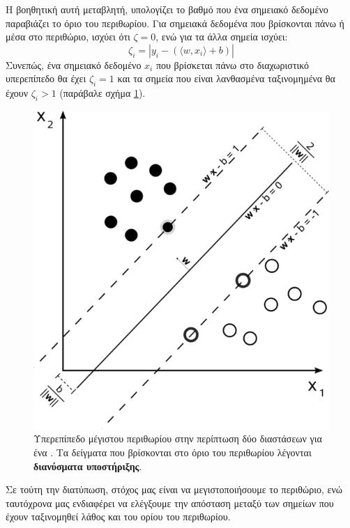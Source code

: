 Η βοηθητική αυτή μεταβλητή, υπολογίζει το βαθμό που ένα σημειακό δεδομένο παραβιάζει το όριο του περιθωρίου.
Για σημειακά δεδομένα που βρίσκονται πάνω ή μέσα στο περιθώριο, ισχύει ότι $\zeta = 0$, ενώ για τα άλλα σημεία ισχύει:
\begin{equation}
\zeta_{i} = | y_{i} - (\langle w, x_{i} \rangle + b )|    
\end{equation}
Συνεπώς, ένα σημειακό δεδομένο $x_{i}$ που βρίσκεται πάνω στο διαχωριστικό υπερεπίπεδο θα έχει $\zeta_{i} = 1$ και τα σημεία που είναι λανθασμένα ταξινομημένα θα έχουν $\zeta_{i} > 1$ (παράβαλε σχήμα \ref{fig:svm_sep}).
\begin{figure}
    \centering
    \includegraphics[scale=0.6]{figures/556px-Svm_max_sep_hyperplane_with_margin.png}
    \caption[Υπερεπίπεδο μέγιστου περιθωρίου στην περίπτωση δύο διαστάσεων για ένα .]{Υπερεπίπεδο μέγιστου περιθωρίου στην περίπτωση δύο διαστάσεων για ένα . Τα δείγματα που βρίσκονται στο όριο του περιθωρίου λέγονται \textbf{διανύσματα υποστήριξης}.}
    \label{fig:svm_sep}
\end{figure}
Σε τούτη την διατύπωση, στόχος μας είναι να μεγιστοποιήσουμε το περιθώριο, ενώ ταυτόχρονα μας ενδιαφέρει να ελέγξουμε την απόσταση μεταξύ των σημείων που έχουν ταξινομηθεί λάθος και του ορίου του περιθωρίου.
